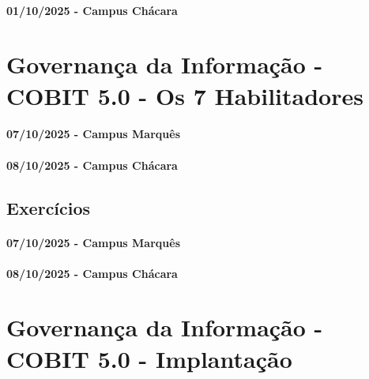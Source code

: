 \documentclass[
]{book}
\begin{document}
\subsubsection*{01/10/2025 - Campus Chácara}\label{campus-chuxe1cara-9}

\chapter{Governança da Informação - COBIT 5.0 - Os 7 Habilitadores}\label{governanuxe7a-da-informauxe7uxe3o---cobit-5.0---os-7-habilitadores}

\subsubsection*{07/10/2025 - Campus Marquês}\label{campus-marquuxeas-10}

\subsubsection*{08/10/2025 - Campus Chácara}\label{campus-chuxe1cara-10}

\section{Exercícios}\label{exercuxedcios-7}

\subsubsection*{07/10/2025 - Campus Marquês}\label{campus-marquuxeas-11}

\subsubsection*{08/10/2025 - Campus Chácara}\label{campus-chuxe1cara-11}

\chapter{Governança da Informação - COBIT 5.0 - Implantação}\label{governanuxe7a-da-informauxe7uxe3o---cobit-5.0---implantauxe7uxe3o}
\end{document}
